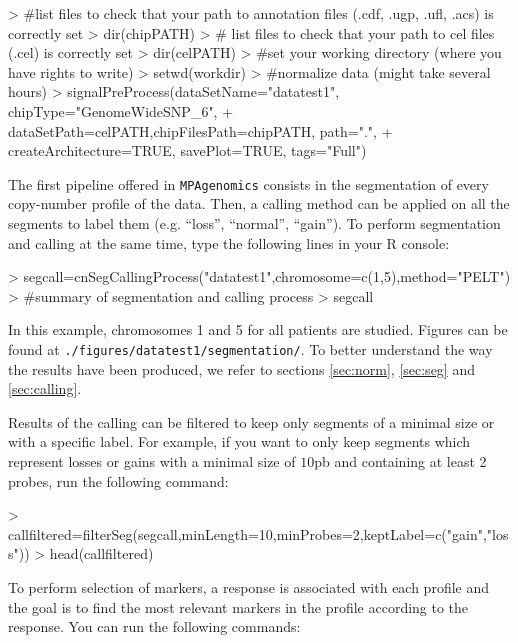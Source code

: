 \documentclass[a4paper,10pt]{article}
\begin{document}
\begin{Schunk}
\begin{Sinput}
> #list files to check that your path to annotation files (.cdf, .ugp, .ufl, .acs) is correctly set
> dir(chipPATH)
> # list files to check that your path to cel files (.cel) is correctly set
> dir(celPATH) 
> #set your working directory (where you have rights to write)
> setwd(workdir) 
> #normalize data (might take several hours)
> signalPreProcess(dataSetName="datatest1", chipType="GenomeWideSNP_6",
+ dataSetPath=celPATH,chipFilesPath=chipPATH, path=".",
+ createArchitecture=TRUE, savePlot=TRUE, tags="Full")
\end{Sinput}
\end{Schunk}
	
			The first pipeline offered in \texttt{MPAgenomics} consists in the segmentation of every copy-number profile of the data. Then, a calling method can be applied on all the segments to label them (e.g. ``loss'', ``normal'', ``gain''). To perform segmentation and calling at the same time, type the following lines in your R console:

\begin{Schunk}
\begin{Sinput}
> segcall=cnSegCallingProcess("datatest1",chromosome=c(1,5),method="PELT")
> #summary of segmentation and calling process
> segcall
\end{Sinput}
\end{Schunk}

			In this example, chromosomes 1 and 5 for all patients are studied. Figures can be found at \texttt{./figures/datatest1/segmentation/}. 
			To better understand the way the results have been produced, we refer to sections \ref{sec:norm}, \ref{sec:seg} and \ref{sec:calling}.
	
			Results of the calling can be filtered to keep only segments of a minimal size or with a specific label. For example, if you want to only keep segments which represent losses or gains with a minimal size of $10$pb and containing at least 2 probes, run the following command:  
	
\begin{Schunk}
\begin{Sinput}
> callfiltered=filterSeg(segcall,minLength=10,minProbes=2,keptLabel=c("gain","loss"))
> head(callfiltered)
\end{Sinput}
\end{Schunk}
	
			To perform selection of markers, a response is associated with each profile and the goal is to find the most relevant markers in the profile according to the response. You can run the following commands:
\end{document}
